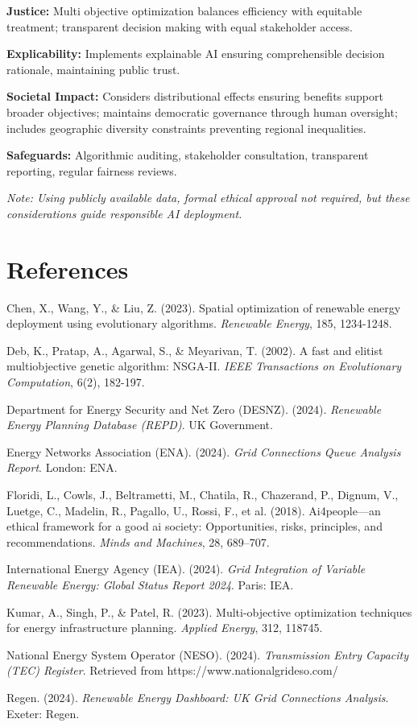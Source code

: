 \documentclass[12pt,a4paper]{article}
\begin{document}
\textbf{Justice:} Multi objective optimization balances efficiency with equitable treatment; transparent decision making with equal stakeholder access.

\textbf{Explicability:} Implements explainable AI ensuring comprehensible decision rationale, maintaining public trust.

\textbf{Societal Impact:} Considers distributional effects ensuring benefits support broader objectives; maintains democratic governance through human oversight; includes geographic diversity constraints preventing regional inequalities.

\textbf{Safeguards:} Algorithmic auditing, stakeholder consultation, transparent reporting, regular fairness reviews.

\textit{Note: Using publicly available data, formal ethical approval not required, but these considerations guide responsible AI deployment.}



\section*{References}

Chen, X., Wang, Y., \& Liu, Z. (2023). Spatial optimization of renewable energy deployment using evolutionary algorithms. \textit{Renewable Energy}, 185, 1234-1248.

Deb, K., Pratap, A., Agarwal, S., \& Meyarivan, T. (2002). A fast and elitist multiobjective genetic algorithm: NSGA-II. \textit{IEEE Transactions on Evolutionary Computation}, 6(2), 182-197.

Department for Energy Security and Net Zero (DESNZ). (2024). \textit{Renewable Energy Planning Database (REPD)}. UK Government.

Energy Networks Association (ENA). (2024). \textit{Grid Connections Queue Analysis Report}. London: ENA.

Floridi, L., Cowls, J., Beltrametti, M., Chatila, R., Chazerand, P., Dignum, V., Luetge, C., Madelin, R., Pagallo, U., Rossi, F., et al. (2018). Ai4people—an ethical framework for a good ai society: Opportunities, risks, principles, and recommendations. \textit{Minds and Machines}, 28, 689–707.


International Energy Agency (IEA). (2024). \textit{Grid Integration of Variable Renewable Energy: Global Status Report 2024}. Paris: IEA.

Kumar, A., Singh, P., \& Patel, R. (2023). Multi-objective optimization techniques for energy infrastructure planning. \textit{Applied Energy}, 312, 118745.

National Energy System Operator (NESO). (2024). \textit{Transmission Entry Capacity (TEC) Register}. Retrieved from https://www.nationalgrideso.com/

Regen. (2024). \textit{Renewable Energy Dashboard: UK Grid Connections Analysis}. Exeter: Regen.
\end{document}
